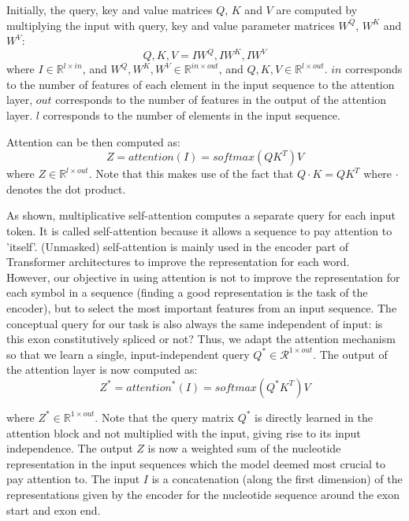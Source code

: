 Initially, the query, key and value matrices $Q$, $K$ and $V$ are computed by multiplying the input with query, key and value parameter matrices $W^Q$, $W^K$ and $W^V$:
$$Q, K, V = IW^Q, IW^K, IW^V$$
where $I \in \mathbb{R}^{l \times in}$, and $W^Q,W^K, W^V \in \mathbb{R}^{in \times out}$,
and $Q,K, V \in \mathbb{R}^{l \times out}$. $in$ corresponds to the number of features of each element in the input sequence to the attention layer, $out$ corresponds to the number of features in the output of the attention layer. $l$ corresponds to the number of elements in the input sequence.

Attention can be then computed as:
$$Z = attention(I) = softmax(QK^T)V$$
where $Z \in \mathbb{R}^{l \times out}$. 
Note that this makes use of the fact that $Q\cdotp K = QK^T$ where $\cdotp$ denotes the dot product.


As shown, multiplicative self-attention computes a separate query for each input token. It is called self-attention because it allows a sequence to pay attention to 'itself'. (Unmasked) self-attention is mainly used in the encoder part of Transformer architectures to improve the representation for each word.\\
However, our objective in using attention is not to improve the representation for each symbol in a sequence (finding a good representation is the task of the encoder), but to select the most important features from an input sequence. The conceptual query for our task is also always the same independent of input: is this exon constitutively spliced or not?
Thus, we adapt the attention mechanism so that we learn a single, input-independent query ${Q}^* \in \mathcal{R}^{1 \times out}$. The output of the attention layer is now computed as:
$$Z^* = {attention}^*(I) = softmax({Q}^*K^T)V$$


where $Z^* \in \mathbb{R}^{1 \times out}$. Note that the query matrix ${Q}^*$ is directly learned in the attention block and not multiplied with the input, giving rise to its input independence. The output $Z$ is now a weighted sum of the nucleotide representation in the input sequences which the model deemed most crucial to pay attention to.
The input $I$ is a concatenation (along the first dimension) of the representations given by the encoder for the nucleotide sequence around the exon start and exon end.



